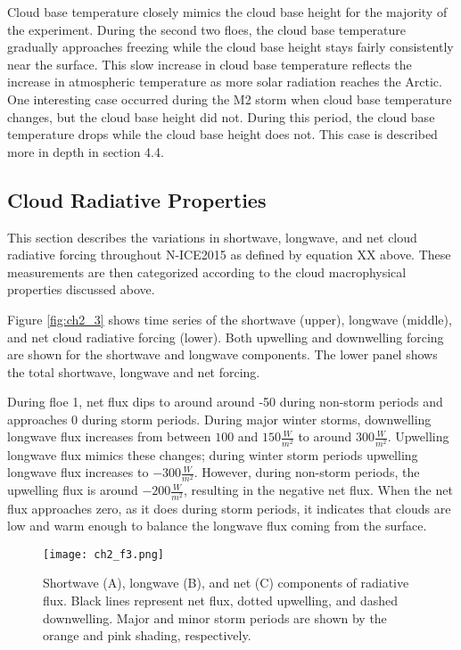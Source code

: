 Cloud base temperature closely mimics the cloud base height for the majority of the experiment. During the second two floes, the cloud base temperature gradually approaches freezing while the cloud base height stays fairly consistently near the surface. This slow increase in cloud base temperature reflects the increase in atmospheric temperature as more solar radiation reaches the Arctic. One interesting case occurred during the M2 storm when cloud base temperature changes, but the cloud base height did not. During this period, the cloud base temperature drops while the cloud base height does not. This case is described more in depth in section 4.4.

\subsection{Cloud Radiative Properties}

This section describes the variations in shortwave, longwave, and net cloud radiative forcing throughout N-ICE2015 as defined by equation XX above. These measurements are then categorized according to the cloud macrophysical properties discussed above.

Figure \ref{fig:ch2_3} shows time series of the shortwave (upper), longwave (middle), and net cloud radiative forcing (lower). Both upwelling and downwelling forcing are shown for the shortwave and longwave components. The lower panel shows the total shortwave, longwave and net forcing.

During floe 1, net flux dips to around around -50 during non-storm periods and approaches $0$ during storm periods. During major winter storms, downwelling longwave flux increases from between $100$ and $150 \frac{W}{m^{2}}$ to around $300 \frac{W}{m^{2}}$. Upwelling longwave flux mimics these changes; during winter storm periods upwelling longwave flux increases to $-300 \frac{W}{m^{2}}$. However, during non-storm periods, the upwelling flux is around $-200 \frac{W}{m^{2}}$, resulting in the negative net flux. When the net flux approaches zero, as it does during storm periods, it indicates that clouds are low and warm enough to balance the longwave flux coming from the surface.

\begin{figure}[H]
    \centering
    \texttt{[image: ch2\_f3.png]}
    \caption[Shortwave, longwave, and net radiative components of flux.]{Shortwave (A), longwave (B), and net (C) components of radiative flux. Black lines represent net flux, dotted upwelling, and dashed downwelling. Major and minor storm periods are shown by the orange and pink shading, respectively.}
    \label{fig:ch2_f3}
\end{figure}

